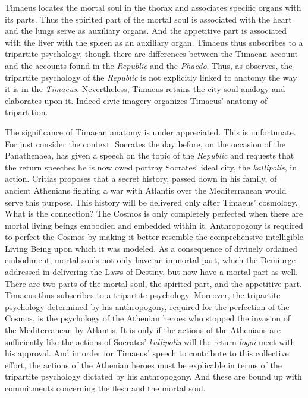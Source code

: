 Timaeus locates the mortal soul in the thorax and associates specific organs with its parts. Thus the spirited part of the mortal soul is associated with the heart and the lungs serve as auxiliary organs. And the appetitive part is associated with the liver with the spleen as an auxiliary organ. Timaeus thus subscribes to a tripartite psychology, though there are differences between the Timaean account and the accounts found in the \emph{Republic} and the \emph{Phaedo}. Thus, as \citet[496]{Taylor:1928qb} observes, the tripartite psychology of the \emph{Republic} is not explicitly linked to anatomy the way it is in the \emph{Timaeus}. Nevertheless, Timaeus retains the city-soul analogy and elaborates upon it. Indeed civic imagery organizes Timaeus' anatomy of tripartition.

The significance of Timaean anatomy is under appreciated. This is unfortunate. For just consider the context. Socrates the day before, on the occasion of the Panathenaea, has given a speech on the topic of the \emph{Republic} and requests that the return speeches he is now owed portray Socrates' ideal city, the \emph{kallipolis}, in action. Critias proposes that a secret history, passed down in his family, of ancient Athenians fighting a war with Atlantis over the Mediterranean would serve this purpose. This history will be delivered only after Timaeus' cosmology. What is the connection? The Cosmos is only completely perfected when there are mortal living beings embodied and embedded within it. Anthropogony is required to perfect the Cosmos by making it better resemble the comprehensive intelligible Living Being upon which it was modeled. As a consequence of divinely ordained embodiment, mortal souls not only have an immortal part, which the Demiurge addressed in delivering the Laws of Destiny, but now have a mortal part as well. There are two parts of the mortal soul, the spirited part, and the appetitive part. Timaeus thus subscribes to a tripartite psychology. Moreover, the tripartite psychology determined by his anthropogony, required for the perfection of the Cosmos, is the psychology of the Athenian heroes who stopped the invasion of the Mediterranean by Atlantis. It is only if the actions of the Athenians are sufficiently like the actions of Socrates' \emph{kallipolis} will the return \emph{logoi} meet with his approval. And in order for Timaeus' speech to contribute to this collective effort, the actions of the Athenian heroes must be explicable in terms of the tripartite psychology dictated by his anthropogony. And these are bound up with commitments concerning the flesh and the mortal soul.

